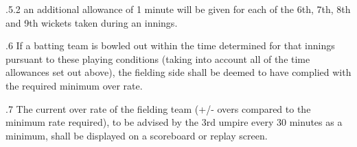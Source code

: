 \documentclass[12pt]{article}
\begin{document}
\vspace{\baselineskip}
\begin{adjustwidth}{1.18in}{0.22in}
{\fontsize{9pt}{10.8pt}.5.2 \tabto{1.17in} an additional allowance of 1 minute will be given for each of the 6th, 7th, 8th and 9th wickets taken during an innings.\par}\par

\end{adjustwidth}


\vspace{\baselineskip}

\vspace{\baselineskip}

\vspace{\baselineskip}

\vspace{\baselineskip}
\begin{Center}
{\fontsize{8pt}{9.6pt}\par}
\end{Center}\par


\vspace{\baselineskip}

\vspace{\baselineskip}
\begin{adjustwidth}{0.5in}{0.03in}
{\fontsize{9pt}{10.8pt}.6 \tabto{0.49in} If a batting team is bowled out within the time determined for that innings pursuant to these playing conditions (taking into account all of the time allowances set out above), the fielding side shall be deemed to have complied with the required minimum over rate.\par}\par

\end{adjustwidth}


\vspace{\baselineskip}
\begin{adjustwidth}{0.5in}{0.1in}
{\fontsize{9pt}{10.8pt}.7 \tabto{0.49in} The current over rate of the fielding team (+/- overs compared to the minimum rate required), to be advised by the 3rd umpire every 30 minutes as a minimum, shall be displayed on a scoreboard or replay screen.\par}\par

\end{adjustwidth}
\end{document}
